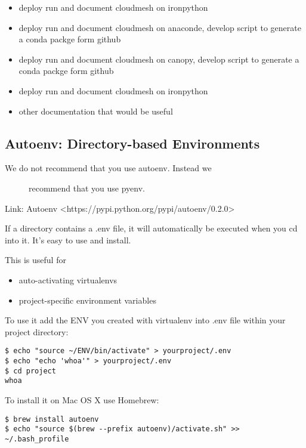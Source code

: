 \begin{itemize}
\tightlist
\item
  deploy run and document cloudmesh on ironpython
\item
  deploy run and document cloudmesh on anaconde, develop script to
  generate a conda packge form github
\item
  deploy run and document cloudmesh on canopy, develop script to
  generate a conda packge form github
\item
  deploy run and document cloudmesh on ironpython
\item
  other documentation that would be useful
\end{itemize}

\subsection{Autoenv: Directory-based
Environments}\label{autoenv-directory-based-environments}

\begin{description}
\item[We do not recommend that you use autoenv. Instead we]
recommend that you use pyenv.
\end{description}

Link:
Autoenv \textless{}https://pypi.python.org/pypi/autoenv/0.2.0\textgreater{}

If a directory contains a .env file, it will automatically be executed
when you cd into it. It's easy to use and install.

This is useful for

\begin{itemize}
\tightlist
\item
  auto-activating virtualenvs
\item
  project-specific environment variables
\end{itemize}

To use it add the ENV you created with virtualenv into .env file within
your project directory:

\begin{verbatim}
$ echo "source ~/ENV/bin/activate" > yourproject/.env
$ echo "echo 'whoa'" > yourproject/.env
$ cd project
whoa
\end{verbatim}

To install it on Mac OS X use Homebrew:

\begin{verbatim}
$ brew install autoenv
$ echo "source $(brew --prefix autoenv)/activate.sh" >> ~/.bash_profile
\end{verbatim}

